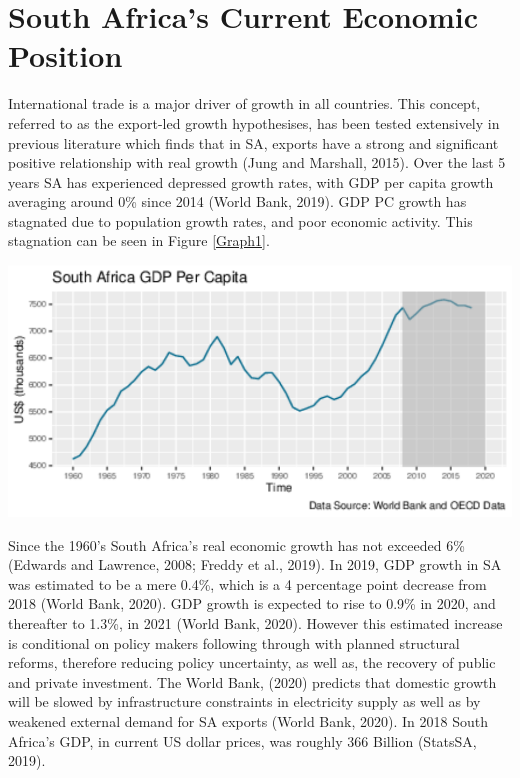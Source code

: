 \documentclass[11pt,preprint, authoryear]{elsarticle}
\let\origfigure\figure
\let\endorigfigure\endfigure
\renewenvironment{figure}[1][2] {
    \expandafter\origfigure\expandafter[H]
} {
    \endorigfigure
}
\numberwithin{equation}{section}
\numberwithin{figure}{section}
\numberwithin{table}{section}
\begin{document}
\hypertarget{south-africas-current-economic-position}{%
\section{\texorpdfstring{South Africa's Current Economic
Position\label{SAcurrent}}{South Africa's Current Economic Position}}\label{south-africas-current-economic-position}}

International trade is a major driver of growth in all countries. This
concept, referred to as the export-led growth hypothesises, has been
tested extensively in previous literature which finds that in SA,
exports have a strong and significant positive relationship with real
growth (Jung and Marshall, 2015). Over the last 5 years SA has
experienced depressed growth rates, with GDP per capita growth averaging
around 0\% since 2014 (World Bank, 2019). GDP PC growth has stagnated
due to population growth rates, and poor economic activity. This
stagnation can be seen in Figure \ref{Graph1}.

\begin{figure}[H]

{\centering \includegraphics{tradedynamics1_files/figure-latex/Graph1-1} 

}

\caption{South Africa - GDP PC 1960-2019 in Constant 2010 US Dollars \label{Graph1}}\label{fig:Graph1}
\end{figure}

Since the 1960's South Africa's real economic growth has not exceeded
6\% (Edwards and Lawrence, 2008; Freddy et al., 2019). In 2019, GDP
growth in SA was estimated to be a mere 0.4\%, which is a 4 percentage
point decrease from 2018 (World Bank, 2020). GDP growth is expected to
rise to 0.9\% in 2020, and thereafter to 1.3\%, in 2021 (World Bank,
2020). However this estimated increase is conditional on policy makers
following through with planned structural reforms, therefore reducing
policy uncertainty, as well as, the recovery of public and private
investment. The World Bank, (2020) predicts that domestic growth will be
slowed by infrastructure constraints in electricity supply as well as by
weakened external demand for SA exports (World Bank, 2020). In 2018
South Africa's GDP, in current US dollar prices, was roughly 366 Billion
(StatsSA, 2019).
\end{document}
